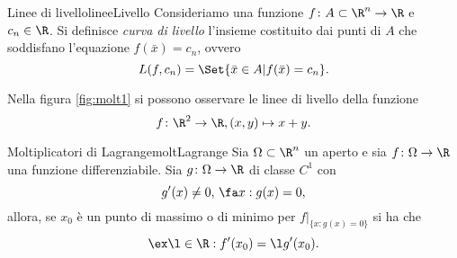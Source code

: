 \begin{defn}{Linee di livello}{lineeLivello}
	Consideriamo una funzione \(f\colon A\subset\R^n\to \R\) e \(c_n\in\R\).
	Si definisce \emph{curva di livello} l'insieme costituito dai punti di \(A\) che soddisfano l'equazione \(f(\bar{x})=c_n\), ovvero
	\[
		L(f,c_n)=\Set{\bar{x}\in A | f(\bar{x})=c_n}.
	\]
\end{defn}

\begin{oss}
	Nella figura \ref{fig:molt1} si possono osservare le linee di livello della funzione
	\[
		f\colon \R^2\to \R,(x,y)\mapsto x+y.
	\]
\end{oss}

\begin{teor}{Moltiplicatori di Lagrange}{moltLagrange}
	Sia \(\Omega\subset\R^n\) un aperto e sia \(f\colon \Omega\to\R\) una funzione differenziabile.
	Sia \(g\colon \Omega\to \R\) di classe \(C^1\) con
	\[
		g'(x)\neq 0,\,\fa x:g(x)=0,
	\]
	allora, se \(x_0\) è un punto di massimo o di minimo per \(f|_{\{x:g(x)=0\}}\) si ha che
	\[
		\ex \l\in\R:f'(x_0)=\l g'(x_0).
	\]
\end{teor}

